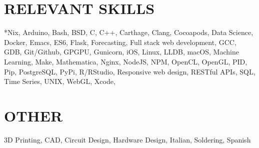 \documentclass[margin]{../res}
\begin{document}
\begin{resume}
\section{RELEVANT SKILLS}
*Nix, Arduino, Bash, BSD, C, C++, Carthage, Clang, Cocoapods, Data Science, Docker, Emacs,
ES6, Flask, Forecasting,
Full stack web development, GCC, GDB, Git/Github, GPGPU, Gunicorn, iOS, Linux, LLDB,
macOS, Machine
Learning, Make, Mathematica, Nginx, NodeJS, NPM, OpenCL, OpenGL, PID, Pip, PostgreSQL,
PyPi, R/RStudio, Responsive web design, RESTful APIs, SQL, Time Series, UNIX, WebGL, Xcode,

  \section{OTHER}
  3D Printing, CAD, Circuit Design,
  Hardware Design, Italian, Soldering, Spanish
 
\end{resume}
\end{document}
